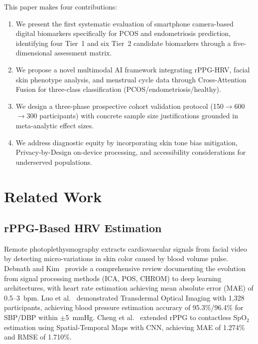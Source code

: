 \documentclass[conference]{IEEEtran}
\begin{document}
This paper makes four contributions:
\begin{enumerate}
\item We present the first systematic evaluation of smartphone camera-based digital biomarkers specifically for PCOS and endometriosis prediction, identifying four Tier~1 and six Tier~2 candidate biomarkers through a five-dimensional assessment matrix.
\item We propose a novel multimodal AI framework integrating rPPG-HRV, facial skin phenotype analysis, and menstrual cycle data through Cross-Attention Fusion for three-class classification (PCOS/endometriosis/healthy).
\item We design a three-phase prospective cohort validation protocol (150$\rightarrow$600$\rightarrow$300 participants) with concrete sample size justifications grounded in meta-analytic effect sizes.
\item We address diagnostic equity by incorporating skin tone bias mitigation, Privacy-by-Design on-device processing, and accessibility considerations for underserved populations.
\end{enumerate}

\section{Related Work}

\subsection{rPPG-Based HRV Estimation}

Remote photoplethysmography extracts cardiovascular signals from facial video by detecting micro-variations in skin color caused by blood volume pulse. Debnath and Kim~\cite{debnath2025comprehensive} provide a comprehensive review documenting the evolution from signal processing methods (ICA, POS, CHROM) to deep learning architectures, with heart rate estimation achieving mean absolute error (MAE) of 0.5--3~bpm. Luo et al.~\cite{luo2019smartphone} demonstrated Transdermal Optical Imaging with 1,328 participants, achieving blood pressure estimation accuracy of 95.3\%/96.4\% for SBP/DBP within $\pm$5~mmHg. Cheng et al.~\cite{Cheng_2024} extended rPPG to contactless SpO$_2$ estimation using Spatial-Temporal Maps with CNN, achieving MAE of 1.274\% and RMSE of 1.710\%.
\end{document}
